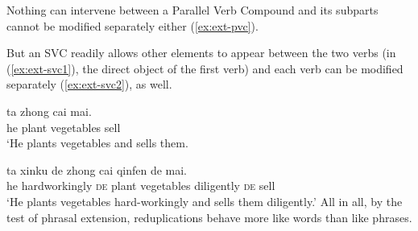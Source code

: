   \z
\z

Nothing can intervene between a Parallel Verb Compound and its subparts cannot be modified separately either (\ref{ex:ext-pvc}).

\ea\label{ex:ext-pvc}
  
  
  
  
  \z
\z

But an {SVC} readily allows other elements to appear between the two verbs (in (\ref{ex:ext-svc1}), the direct object of the first verb) and each verb can be modified separately (\ref{ex:ext-svc2}), as well.

\ea
  \ea\label{ex:ext-svc1}
  \gll ta zhong cai mai.\\
  he plant vegetables sell\\
  \glt `He plants vegetables and sells them.
  
  \ex\label{ex:ext-svc2}
  \gll ta xinku de zhong cai qinfen de mai.\\
  he hardworkingly \textsc{de} plant vegetables diligently \textsc{de} sell\\
  \glt `He plants vegetables hard-workingly and sells them diligently.'
  \z
\z
All in all, by the test of phrasal extension, reduplications behave more like words than like phrases.



